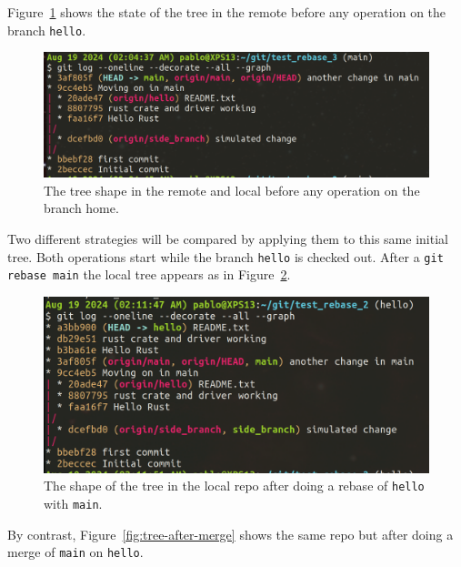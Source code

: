\documentclass[10pt]{article}
\begin{document}
Figure~\ref{fig:initial-tree} shows the state of the tree in the remote before any operation on the branch \texttt{hello}.

\begin{figure}[hb!]
    \centering
    \includegraphics[width=\textwidth]{images/Tree_before_any_op.png}
    \caption{The tree shape in the remote and local before any operation on the branch home.}
    \label{fig:initial-tree}
\end{figure}

Two different strategies will be compared by applying them to this same initial tree.
Both operations start while the branch \texttt{hello} is checked out. 
After a \texttt{git rebase main} the local tree appears as in Figure~\ref{fig:tree-after-rebase}. 


\begin{figure}[hb!]
    \centering
    \includegraphics[width=\textwidth]{images/Tree_after_rebase_main_on_hello.png}
    \caption{The shape of the tree in the local repo after doing a rebase of \texttt{hello} with \texttt{main}.}
    \label{fig:tree-after-rebase}
\end{figure}

By contrast, Figure~\ref{fig:tree-after-merge} shows the same repo but after doing a merge of \texttt{main} on \texttt{hello}.
\end{document}
